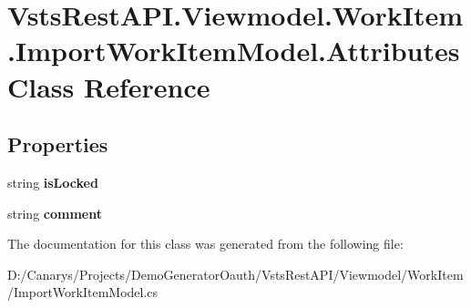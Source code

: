 \hypertarget{class_vsts_rest_a_p_i_1_1_viewmodel_1_1_work_item_1_1_import_work_item_model_1_1_attributes}{}\section{Vsts\+Rest\+A\+P\+I.\+Viewmodel.\+Work\+Item.\+Import\+Work\+Item\+Model.\+Attributes Class Reference}
\label{class_vsts_rest_a_p_i_1_1_viewmodel_1_1_work_item_1_1_import_work_item_model_1_1_attributes}
\subsection*{Properties}
\begin{DoxyCompactItemize}
\item 
\mbox{\label{class_vsts_rest_a_p_i_1_1_viewmodel_1_1_work_item_1_1_import_work_item_model_1_1_attributes_a5db4afe0583decdab21bd8f47a05720c}} 
string {\bfseries is\+Locked}
\item 
\mbox{\label{class_vsts_rest_a_p_i_1_1_viewmodel_1_1_work_item_1_1_import_work_item_model_1_1_attributes_abef54917cbfe8ed78a745e0cc02913bf}} 
string {\bfseries comment}
\end{DoxyCompactItemize}


The documentation for this class was generated from the following file\+:\begin{DoxyCompactItemize}
\item 
D\+:/\+Canarys/\+Projects/\+Demo\+Generator\+Oauth/\+Vsts\+Rest\+A\+P\+I/\+Viewmodel/\+Work\+Item/Import\+Work\+Item\+Model.\+cs\end{DoxyCompactItemize}
